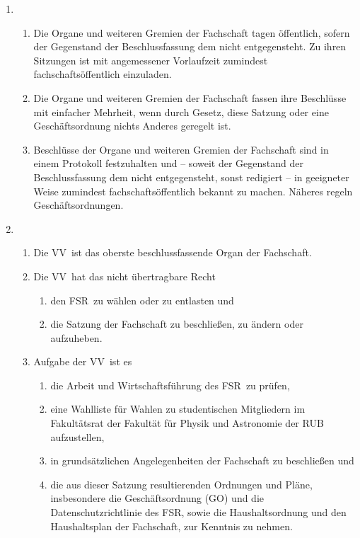 \documentclass[a4paper, 12pt]{article}
\newcommand{\vv}{VV}
\newcommand{\rat}{FSR}
\newcommand{\rates}{FSR}
\begin{document}
\begin{enumerate}[leftmargin=0cm]
	\item {}
	\begin{enumerate}[leftmargin=0cm]
		\item Die Organe und weiteren Gremien der Fachschaft tagen öffentlich, sofern der Gegenstand der Beschlussfassung dem nicht entgegensteht. Zu ihren Sitzungen ist mit angemessener Vorlaufzeit zumindest fachschaftsöffentlich einzuladen.
		\item Die Organe und weiteren Gremien der Fachschaft fassen ihre Beschlüsse mit einfacher Mehrheit, wenn durch Gesetz, diese Satzung oder eine Geschäftsordnung nichts Anderes geregelt ist.
		\item  Beschlüsse der Organe und weiteren Gremien der Fachschaft sind in einem Protokoll festzuhalten und – soweit  der Gegenstand der Beschlussfassung dem nicht entgegensteht, sonst redigiert – in geeigneter Weise zumindest fachschaftsöffentlich bekannt zu machen. Näheres regeln  Geschäftsordnungen. 
	\end{enumerate}
	
	
	\item {}
	\begin{enumerate}[leftmargin=0cm]
		\item Die \vv~ist das oberste beschlussfassende Organ der Fachschaft.
		\item Die \vv~hat das nicht übertragbare Recht
		\begin{enumerate}[leftmargin=0.5cm]
			\item den \rat~zu wählen oder zu entlasten und
			\item die Satzung der Fachschaft zu beschließen, zu ändern oder aufzuheben.
		\end{enumerate}
		\item Aufgabe der \vv~ist es
		\begin{enumerate}[leftmargin=0.5cm]
			\item die Arbeit und Wirtschaftsführung des \rates~zu prüfen,
			\item eine Wahlliste für Wahlen zu studentischen Mitgliedern im Fakultätsrat der Fakultät für Physik und Astronomie der RUB aufzustellen,
			\item in grundsätzlichen Angelegenheiten der Fachschaft zu beschließen und
			\item die aus dieser Satzung resultierenden Ordnungen und Pläne, insbesondere
			die Geschäftsordnung (GO) und
			die Datenschutzrichtlinie des \rates, sowie
			die Haushaltsordnung und
			den Haushaltsplan der Fachschaft,
			zur Kenntnis zu nehmen.
		\end{enumerate}
	\end{enumerate}


\end{enumerate}
\end{document}
